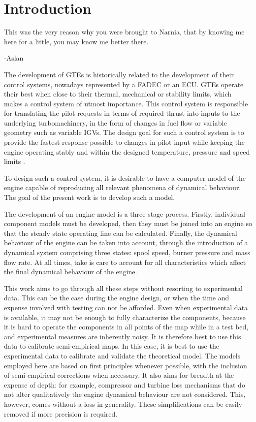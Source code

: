 \documentclass[tcc]{subfiles}
\begin{document}
\chapter{Introduction}
\label{ch:intro}
\epigraph{This was the very reason why you were brought to Narnia, that by knowing me here for a little, you may know me better there.}{-Aslan}

The development of \acp{GTE} is historically related to the development of their control systems, 
nowadays represented by a \ac{FADEC} or an \ac{ECU}. \Acp{GTE} operate their best when close to their
thermal, mechanical or stability limits, which makes a control system of utmost importance.
This control system is responsible for translating the pilot requests in terms of required thrust 
into inputs to the underlying turbomachinery, 
in the form of changes in fuel flow or variable geometry such as variable \acp{IGV}.
The design goal for such a control system is to provide the fastest response possible to changes in pilot input
while keeping the engine operating stably and within the designed temperature, pressure and speed limits
\cite{AustinSpangIII1999}.

To design such a control system, it is desirable to have a computer model of the engine 
capable of reproducing all relevant phenomena of dynamical behaviour. 
The goal of the present work is to develop such a model. 

The development of an engine model is a three stage process. Firstly, individual component models must be developed, then they must be joined into an engine so that the steady state operating line can be calculated.
Finally, the dynamical behaviour of the engine can be taken into account, through the introduction of a dynamical system comprising three states: spool speed, burner pressure and mass flow rate. 
At all times, take is care to account for all characteristics which affect the final dynamical behaviour of the engine.

This work aims to go through all these steps without resorting to experimental data.
This can be the case during the engine design, or when the time and expense involved with testing can not be afforded.
Even when experimental data is available, it may not be enough to fully characterize the components,
because it is hard to operate the components in all points of the map while in a test bed, 
and experimental measures are inherently noisy. 
It is therefore best to use this data to calibrate semi-empirical maps.
In this case, it is best to use the experimental data to calibrate and validate the theoretical model.
The models employed here are based on first principles whenever possible, 
with the inclusion of semi-empirical corrections when necessary. 
It also aims for breadth at the expense of depth: 
for example, compressor and turbine loss mechanisms that do not alter qualitatively the engine dynamical behaviour are not considered. 
This, however, comes without a loss in generality. 
These simplifications can be easily removed if more precision is required.
\end{document}
